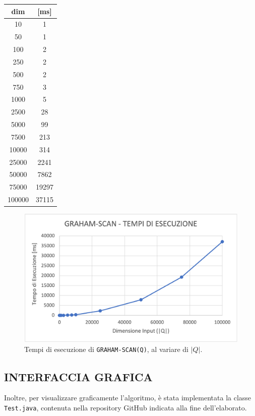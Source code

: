 \documentclass[12pt,a4paper]{report}
\begin{document}
\begin{center}
\begin{tabular}{|c|c|} 
 \hline
 dim & [ms]\\
 \hline\hline
 10 & 1\\
 \hline
 50 & 1\\
 \hline
 100 & 2\\
 \hline
 250 & 2\\
 \hline
 500 & 2\\
 \hline
 750 & 3\\
 \hline
 1000 & 5\\
 \hline
 2500 & 28\\
 \hline
 5000 & 99\\
 \hline
 7500 & 213\\
 \hline
 10000 & 314\\
 \hline
 25000 & 2241\\
 \hline
 50000 & 7862\\
 \hline
 75000 & 19297\\
 \hline
 100000 & 37115\\
 \hline
 
\end{tabular}
\end{center}

\begin{figure}[ht]
    \centering
    \includegraphics[width=0.8\linewidth]{datisperimentali.png}
    \caption{Tempi di esecuzione di \texttt{GRAHAM-SCAN(Q)}, al variare di $|Q|$.}
    \label{fig:graficodati}
\end{figure}

\pagebreak

\subsection*{\small{INTERFACCIA GRAFICA}}
Inoltre, per visualizzare graficamente l'algoritmo, è stata implementata la classe \texttt{Test.java}, contenuta nella repository GitHub indicata alla fine dell'elaborato.\\
\end{document}
